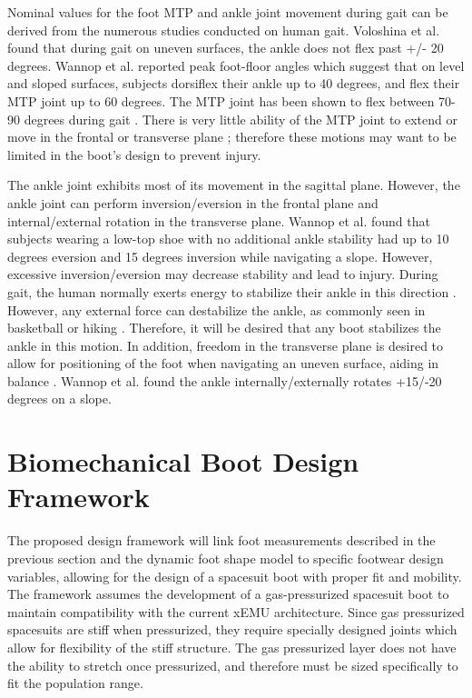 \documentclass[defaultstyle,11pt]{comps}
\begin{document}
Nominal values for the foot MTP and ankle joint movement during gait can be derived from the numerous studies conducted on human gait.
Voloshina et al. \citep{Voloshina2013} found that during gait on uneven surfaces, the ankle does not flex past +/- 20 degrees.
Wannop et al. \citep{Wannop2014} reported peak foot-floor angles which suggest that on level and sloped surfaces, subjects dorsiflex their ankle up to 40 degrees, and flex their MTP joint up to 60 degrees.
The MTP joint has been shown to flex between 70-90 degrees during gait \citep{Mann1979}.
There is very little ability of the MTP joint to extend or move in the frontal or transverse plane \citep{Mann1979}; therefore these motions may want to be limited in the boot's design to prevent injury.

The ankle joint exhibits most of its movement in the sagittal plane.
However, the ankle joint can perform inversion/eversion in the frontal plane and internal/external rotation in the transverse plane.
Wannop et al. \citep{Wannop2014} found that subjects wearing a low-top shoe with no additional ankle stability had up to 10 degrees eversion and 15 degrees inversion while navigating a slope.
However, excessive inversion/eversion may decrease stability and lead to injury.
During gait, the human normally exerts energy to stabilize their ankle in this direction \citep{OLoughlin2009}.
However, any external force can destabilize the ankle, as commonly seen in basketball or hiking \citep{Bohm2010}.
Therefore, it will be desired that any boot stabilizes the ankle in this motion.
In addition, freedom in the transverse plane is desired to allow for positioning of the foot when navigating an uneven surface, aiding in balance \citep{Wannop2014, Fraser2016a}.
Wannop et al. \citep{Wannop2014} found the ankle internally/externally rotates +15/-20 degrees on a slope.

\hypertarget{biomechanical-boot-design-framework}{%
\section{Biomechanical Boot Design Framework}\label{biomechanical-boot-design-framework}}

The proposed design framework will link foot measurements described in the previous section and the dynamic foot shape model to specific footwear design variables, allowing for the design of a spacesuit boot with proper fit and mobility.
The framework assumes the development of a gas-pressurized spacesuit boot to maintain compatibility with the current xEMU architecture.
Since gas pressurized spacesuits are stiff when pressurized, they require specially designed joints which allow for flexibility of the stiff structure.
The gas pressurized layer does not have the ability to stretch once pressurized, and therefore must be sized specifically to fit the population range.
\end{document}

